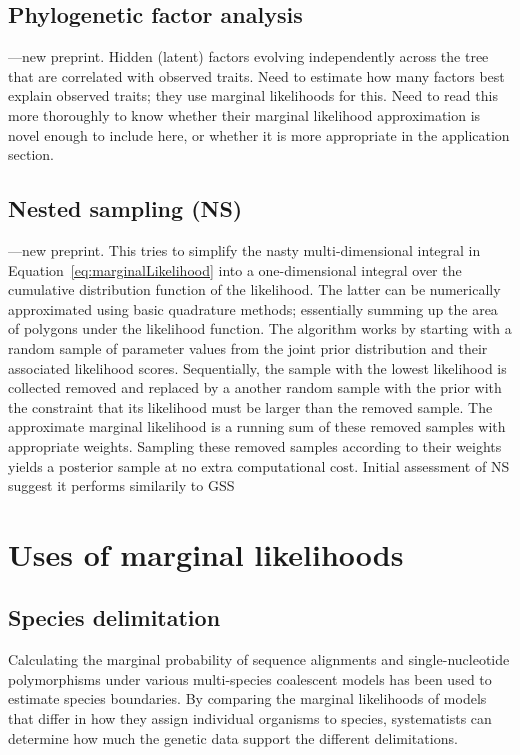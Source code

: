 \subsection{Phylogenetic factor analysis}

\citep{Tolkoff2017}---new preprint.
Hidden (latent) factors evolving independently across the tree
that are correlated with observed traits.
Need to estimate how many factors best explain observed traits; they use
marginal likelihoods for this.
Need to read this more thoroughly to know whether their marginal likelihood
approximation is novel enough to include here, or whether it is more
appropriate in the application section.

\subsection{Nested sampling (NS)}

\citep{Maturana2017}---new preprint.
This tries to simplify the nasty multi-dimensional integral in
Equation~\ref{eq:marginalLikelihood}
into a one-dimensional integral over the cumulative distribution function
of the likelihood.
The latter can be numerically approximated using basic quadrature methods;
essentially summing up the area of polygons under the likelihood function.
The algorithm works by starting with a random sample of parameter values
from the joint prior distribution and their associated likelihood
scores.
Sequentially, the sample with the lowest likelihood is collected removed and
replaced by a another random sample with the prior with the constraint that its
likelihood must be larger than the removed sample.
The approximate marginal likelihood is a running sum of these removed samples
with appropriate weights.
Sampling these removed samples according to their weights yields a posterior
sample at no extra computational cost.
Initial assessment of NS suggest it performs similarily to GSS


\section{Uses of marginal likelihoods}

\subsection{Species delimitation}
Calculating the marginal probability of sequence alignments \citep{Grummer2013}
and single-nucleotide polymorphisms \citep{Leache2014}
under various multi-species coalescent models has been used
to estimate species boundaries.
By comparing the marginal likelihoods of models that differ in
how they assign individual organisms to species, systematists
can determine how much the genetic data support the different
delimitations.

